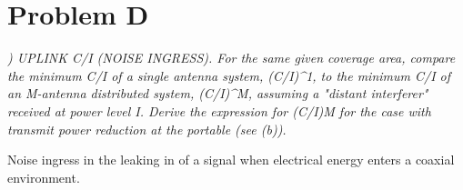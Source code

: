 \section{Problem D}
\textit{) UPLINK C/I (NOISE INGRESS). For the same given coverage area, compare the minimum C/I of a single 
antenna system, (C/I)^1, to the minimum C/I of an M-antenna distributed system, (C/I)^M, assuming a "distant 
interferer" received at power level I. Derive the expression for (C/I)M for the case with transmit power 
reduction at the portable (see (b)).}

Noise ingress in the leaking in of a signal when electrical energy enters a coaxial environment. 